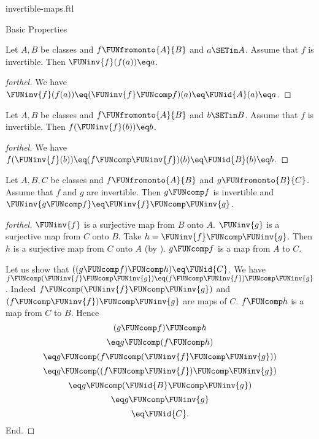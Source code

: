 \documentclass{naproche-library}
\begin{document}
\begin{smodule}[title=Invertible Maps]{invertible-maps.ftl}
\begin{sfragment}{Basic Properties}
  \begin{proposition}[forthel,id=FOUNDATIONS_09_4606651604664320]
    Let $A, B$ be classes and $f \FUNfromonto{A}{B}$ and $a \SETin A$.
    Assume that $f$ is invertible.
    Then $\FUNinv{f}(f(a)) \eq a$.
  \end{proposition}
  \begin{proof}[forthel]
    We have $\FUNinv{f}(f(a)) \eq (\FUNinv{f} \FUNcomp f)(a) \eq \FUNid{A}(a) \eq a$.
  \end{proof}

  \begin{proposition}[forthel,id=FOUNDATIONS_09_6093864386712935]
    Let $A, B$ be classes and $f \FUNfromonto{A}{B}$ and $b \SETin B$.
    Assume that $f$ is invertible.
    Then $f(\FUNinv{f}(b)) \eq b$.
  \end{proposition}
  \begin{proof}[forthel]
    We have
    $f(\FUNinv{f}(b))
      \eq (f \FUNcomp \FUNinv{f})(b)
      \eq \FUNid{B}(b)
      \eq b$.
  \end{proof}

  \begin{proposition}[forthel,id=FOUNDATIONS_09_7619151963095040]
    Let $A, B, C$ be classes and $f \FUNfromonto{A}{B}$ and $g \FUNfromonto{B}{C}$.
    Assume that $f$ and $g$ are invertible.
    Then $g \FUNcomp f$ is invertible and $\FUNinv{g \FUNcomp f} \eq \FUNinv{f} \FUNcomp \FUNinv{g}$.
  \end{proposition}
  \begin{proof}[forthel]
    $\FUNinv{f}$ is a surjective map from $B$ onto $A$.
    $\FUNinv{g}$ is a surjective map from $C$ onto $B$.
    Take $h = \FUNinv{f} \FUNcomp \FUNinv{g}$.
    Then $h$ is a surjective map from $C$ onto $A$ (by ).
    $g \FUNcomp f$ is a map from $A$ to $C$.

    Let us show that $((g \FUNcomp f) \FUNcomp h) \eq \FUNid{C}$.
      We have $f \FUNcomp (\FUNinv{f} \FUNcomp \FUNinv{g}) \eq (f \FUNcomp \FUNinv{f}) \FUNcomp \FUNinv{g}$.
      Indeed $f \FUNcomp (\FUNinv{f} \FUNcomp \FUNinv{g})$ and $(f \FUNcomp \FUNinv{f}) \FUNcomp \FUNinv{g}$ are maps of $C$.
      $f \FUNcomp h$ is a map from $C$ to $B$.
      Hence
      \[  (g \FUNcomp f) \FUNcomp h                           \]
      \[    \eq g \FUNcomp (f \FUNcomp h)                       \]
      \[    \eq g \FUNcomp (f \FUNcomp (\FUNinv{f} \FUNcomp \FUNinv{g}))   \]
      \[    \eq g \FUNcomp ((f \FUNcomp \FUNinv{f}) \FUNcomp \FUNinv{g})   \]
      \[    \eq g \FUNcomp (\FUNid{B} \FUNcomp \FUNinv{g})            \]
      \[    \eq g \FUNcomp \FUNinv{g}                            \]
      \[    \eq \FUNid{C}.                                  \]
    End.


\end{proof}
\end{sfragment}
\end{smodule}
\end{document}
